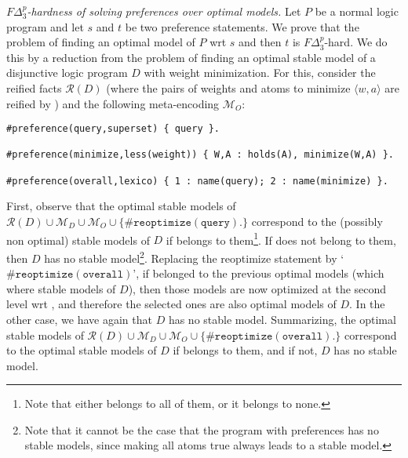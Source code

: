 \emph{$F\Delta^p_3$-hardness of solving preferences over optimal models.}
%  
Let $P$ be a normal logic program and let $s$ and $t$ be two preference statements.
%
We prove that the problem of finding an optimal model of $P$ wrt $s$ and then $t$ is $F\Delta^p_3$-hard.
%
We do this by a reduction from the problem of finding 
an optimal stable model of a disjunctive logic program $D$ with weight minimization.
%
For this, consider the reified facts $\mathcal{R}(D)$
(where the pairs of weights and atoms to minimize $\langle w, a \rangle$ are reified by ) 
and the following meta-encoding $\mathcal{M}_O$:
\begin{lstlisting}
#preference(query,superset) { query }.

#preference(minimize,less(weight)) { W,A : holds(A), minimize(W,A) }.

#preference(overall,lexico) { 1 : name(query); 2 : name(minimize) }.

\end{lstlisting}
First, observe that the optimal stable models of 
$\mathcal{R}(D) \cup \mathcal{M}_D \cup \mathcal{M}_O \cup \{ \mathtt{\#reoptimize(query).} \}$
correspond to the (possibly non optimal) stable models of $D$  if  belongs to them\footnote{Note
that either  belongs to all of them, or it belongs to none.}.
%
If  does not belong to them, 
then $D$ has no stable model\footnote{
Note that it cannot be the case that the program with preferences has no stable models, 
since making all  atoms true always leads to a stable model.}.
%
Replacing the reoptimize statement by `$\mathtt{\#reoptimize(overall)}$',
if  belonged to the previous optimal models (which where stable models of $D$), 
then those models are now optimized at the second level wrt , 
and therefore the selected ones are also optimal models of $D$.
In the other case, we have again that $D$ has no stable model.
%
Summarizing, the optimal stable models of 
$\mathcal{R}(D) \cup \mathcal{M}_D \cup \mathcal{M}_O \cup \{ \mathtt{\#reoptimize(overall).} \}$
correspond to the optimal stable models of $D$ if  belongs to them, 
and if not, $D$ has no stable model.



